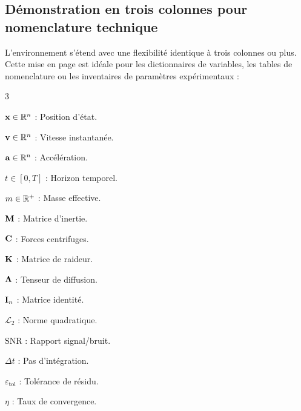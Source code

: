 \subsection{Démonstration en trois colonnes pour nomenclature technique}

L'environnement  s'étend avec une flexibilité identique à trois colonnes ou plus.
Cette mise en page est idéale pour les dictionnaires de variables,
les tables de nomenclature ou les inventaires de paramètres expérimentaux :

\begin{multicols}{3}
\raggedcolumns
\raggedright
\small

\noindent{\bfseries\sffamily\textcolor{ThesisPrimary}{Paramètres d'état :}}\par\vspace{2pt}
$\boldsymbol{\mathbf{x}} \in \mathbb{R}^n$ : Position d'état.\par
$\boldsymbol{\mathbf{v}} \in \mathbb{R}^n$ : Vitesse instantanée.\par
$\boldsymbol{\mathbf{a}} \in \mathbb{R}^n$ : Accélération.\par
$t \in [0, T]$ : Horizon temporel.\par
$m \in \mathbb{R}^+$ : Masse effective.

\columnbreak

\noindent{\bfseries\sffamily\textcolor{ThesisPrimary}{Opérateurs tensoriels :}}\par\vspace{2pt}
$\boldsymbol{\mathbf{M}}$ : Matrice d'inertie.\par
$\boldsymbol{\mathbf{C}}$ : Forces centrifuges.\par
$\boldsymbol{\mathbf{K}}$ : Matrice de raideur.\par
$\boldsymbol{\mathbf{\Lambda}}$ : Tenseur de diffusion.\par
$\boldsymbol{\mathbf{I}}_n$ : Matrice identité.

\columnbreak

\noindent{\bfseries\sffamily\textcolor{ThesisPrimary}{Critères et Métriques :}}\par\vspace{2pt}
$\mathcal{L}_2$ : Norme quadratique.\par
$\mathrm{SNR}$ : Rapport signal/bruit.\par
$\Delta t$ : Pas d'intégration.\par
$\varepsilon_{\mathrm{tol}}$ : Tolérance de résidu.\par
$\eta$ : Taux de convergence.

\end{multicols}

